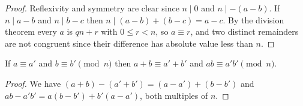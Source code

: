 \documentclass[10pt]{article}
\theoremstyle{break}
\begin{document}
\begin{proof}
Reflexivity and symmetry are clear since $n \mid 0$ and $n \mid -(a-b)$. If
$n \mid a-b$ and $n \mid b-c$ then $n \mid (a-b)+(b-c) = a-c$. By the division
theorem every $a$ is $qn + r$ with $0 \le r < n$, so $a \equiv r$, and two
distinct remainders are not congruent since their difference has absolute value
less than $n$.
\end{proof}

\begin{lemma}
If $a \equiv a'$ and $b \equiv b' \pmod{n}$ then $a + b \equiv a' + b'$ and
$ab \equiv a'b' \pmod{n}$.
\end{lemma}

\begin{proof}
We have $(a+b) - (a'+b') = (a-a') + (b-b')$ and
$ab - a'b' = a(b-b') + b'(a-a')$, both multiples of $n$.
\end{proof}
\end{document}
